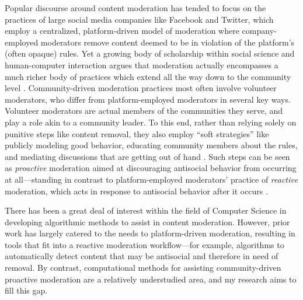 \documentclass[11pt,letterpaper]{article}
\begin{document}
Popular discourse around content moderation has tended to focus on the practices of large social media companies like Facebook and Twitter, which employ a centralized, platform-driven model of moderation where company-employed moderators remove content deemed to be in violation of the platform's (often opaque) rules.
Yet a growing body of scholarship within social science and human-computer interaction argues that moderation actually encompasses a much richer body of practices which extend all the way down to the community level \cite{brewer_inclusion_2020,lampe_slashdot_2004,seering_reconsidering_2020}.
Community-driven moderation practices most often involve volunteer moderators, who differ from platform-employed moderators in several key ways.
Volunteer moderators are actual members of the communities they serve, and play a role akin to a community leader.
To this end, rather than relying solely on punitive steps like content removal, they also employ ``soft strategies'' like publicly modeling good behavior, educating community members about the rules, and mediating discussions that are getting out of hand \cite{seering_shaping_2017,billings_understanding_2010}.
Such steps can be seen as \emph{proactive} moderation aimed at discouraging antisocial behavior from occurring at all---standing in contrast to platform-employed moderators' practice of \emph{reactive} moderation, which acts in response to antisocial behavior after it occurs \cite{lo_when_2018}.

There has been a great deal of interest within the field of Computer Science in developing algorithmic methods to assist in content moderation.
However, prior work has largely catered to the needs to platform-driven moderation, resulting in tools that fit into a reactive moderation workflow---for example, algorithms to automatically detect content that may be antisocial and therefore in need of removal.
By contrast, computational methods for assisting community-driven proactive moderation are a relatively understudied area, and my research aims to fill this gap.


\end{document}
